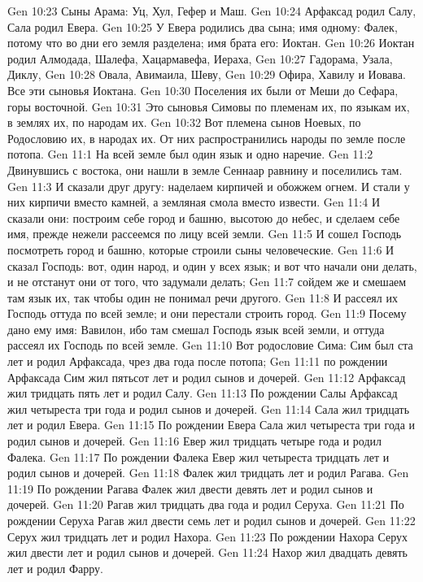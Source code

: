 Gen 10:23  Сыны Арама: Уц, Хул, Гефер и Маш.
Gen 10:24  Арфаксад родил Салу, Сала родил Евера.
Gen 10:25  У Евера родились два сына; имя одному: Фалек, потому что во дни его земля разделена; имя брата его: Иоктан.
Gen 10:26  Иоктан родил Алмодада, Шалефа, Хацармавефа, Иераха,
Gen 10:27  Гадорама, Узала, Диклу,
Gen 10:28  Овала, Авимаила, Шеву,
Gen 10:29  Офира, Хавилу и Иовава. Все эти сыновья Иоктана.
Gen 10:30  Поселения их были от Меши до Сефара, горы восточной.
Gen 10:31  Это сыновья Симовы по племенам их, по языкам их, в землях их, по народам их.
Gen 10:32  Вот племена сынов Ноевых, по Родословию их, в народах их. От них распространились народы по земле после потопа.
Gen 11:1  На всей земле был один язык и одно наречие.
Gen 11:2  Двинувшись с востока, они нашли в земле Сеннаар равнину и поселились там.
Gen 11:3  И сказали друг другу: наделаем кирпичей и обожжем огнем. И стали у них кирпичи вместо камней, а земляная смола вместо извести.
Gen 11:4  И сказали они: построим себе город и башню, высотою до небес, и сделаем себе имя, прежде нежели рассеемся по лицу всей земли.
Gen 11:5  И сошел Господь посмотреть город и башню, которые строили сыны человеческие.
Gen 11:6  И сказал Господь: вот, один народ, и один у всех язык; и вот что начали они делать, и не отстанут они от того, что задумали делать;
Gen 11:7  сойдем же и смешаем там язык их, так чтобы один не понимал речи другого.
Gen 11:8  И рассеял их Господь оттуда по всей земле; и они перестали строить город.
Gen 11:9  Посему дано ему имя: Вавилон, ибо там смешал Господь язык всей земли, и оттуда рассеял их Господь по всей земле.
Gen 11:10  Вот родословие Сима: Сим был ста лет и родил Арфаксада, чрез два года после потопа;
Gen 11:11  по рождении Арфаксада Сим жил пятьсот лет и родил сынов и дочерей.
Gen 11:12  Арфаксад жил тридцать пять лет и родил Салу.
Gen 11:13  По рождении Салы Арфаксад жил четыреста три года и родил сынов и дочерей.
Gen 11:14  Сала жил тридцать лет и родил Евера.
Gen 11:15  По рождении Евера Сала жил четыреста три года и родил сынов и дочерей.
Gen 11:16  Евер жил тридцать четыре года и родил Фалека.
Gen 11:17  По рождении Фалека Евер жил четыреста тридцать лет и родил сынов и дочерей.
Gen 11:18  Фалек жил тридцать лет и родил Рагава.
Gen 11:19  По рождении Рагава Фалек жил двести девять лет и родил сынов и дочерей.
Gen 11:20  Рагав жил тридцать два года и родил Серуха.
Gen 11:21  По рождении Серуха Рагав жил двести семь лет и родил сынов и дочерей.
Gen 11:22  Серух жил тридцать лет и родил Нахора.
Gen 11:23  По рождении Нахора Серух жил двести лет и родил сынов и дочерей.
Gen 11:24  Нахор жил двадцать девять лет и родил Фарру.
